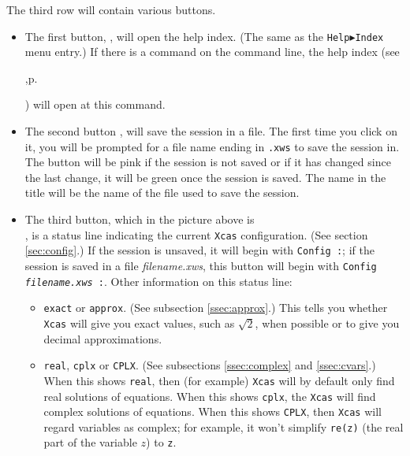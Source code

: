 \documentclass[a4paper,11pt]{book}
\begin{document}
The third row will contain various buttons.
\begin{itemize}
  \item The first button, , will open the help index.
  (The same as the \texttt{Help$\blacktriangleright$Index} menu entry.)
  If there is a command on the command line, the help index 
  (see 
  \begin{latexonly},p.\pageref{sssec:helpind}\end{latexonly})
  will open at this command.
  
  \item The second button , will save the session
  in a file.  The first time you click on it, you will be prompted for
  a file name ending in \texttt{.xws} to save the session in.  The
  button will be pink if the session is not saved or if it has changed
  since the last change, it will be green once the session is saved.
  The name in the title will be the name of the file used to save the
  session.

\item The third button, which in the picture above is\\
  , is a status
  line indicating the current \texttt{Xcas} configuration. 
  (See section \ref{sec:config}.)
  If the session is unsaved, it will begin with \texttt{Config :}; if the
  session is saved in a file \textit{filename.xws}, this button will
  begin with \texttt{\texttt{Config }\textit{filename.xws}\texttt{ :}}.
  Other information on this status line:
  \begin{itemize}
    \item \texttt{exact} or \texttt{approx}.  
    (See subsection \ref{ssec:approx}.)
    This tells you whether
    \texttt{Xcas} will give you exact values, such as
    $\sqrt{2}$, when possible or to give you decimal approximations.

    \item \texttt{real}, \texttt{cplx} or \texttt{CPLX}.  
    (See subsections \ref{ssec:complex} and \ref{ssec:cvars}.)
    When this shows \texttt{real}, then (for example) \texttt{Xcas} will by
    default only find real solutions of equations.  When this shows
    \texttt{cplx}, the \texttt{Xcas} will find complex solutions of
    equations.  When this shows \texttt{CPLX}, then \texttt{Xcas} will
    regard variables as complex; for example, it won't simplify
    \texttt{re(z)} (the real part of the variable $z$) to \texttt{z}.


\end{itemize}
\end{itemize}
\end{document}
